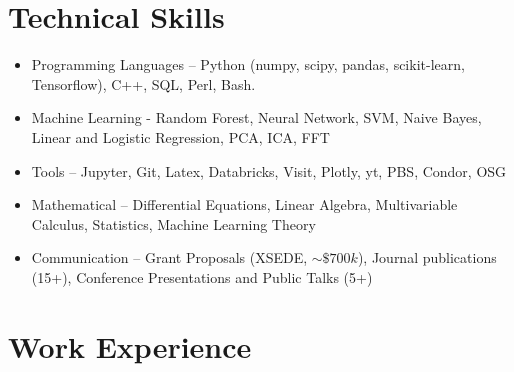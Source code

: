 \documentclass[11pt,a4paper,sans]{moderncv}       %
\begin{document}
\section{Technical Skills}
\vspace{1pt}
\small{
\begin{itemize}
\item{ Programming Languages – Python (numpy, scipy, pandas, scikit-learn, Tensorflow), C++, SQL, Perl, Bash.} %
\vspace{4pt}
\item{Machine Learning - Random Forest, Neural Network, SVM, Naive Bayes, Linear and Logistic Regression,  PCA, ICA, FFT}
\vspace{4pt}
\item{Tools – Jupyter, Git, Latex, Databricks, Visit, Plotly, yt, PBS, Condor, OSG}
\vspace{4pt}
\item{Mathematical – Differential Equations, Linear Algebra, Multivariable Calculus, Statistics, Machine Learning Theory}\vspace{4pt}
\item{Communication – Grant Proposals (XSEDE, $\sim \$700k$), Journal publications (15+), Conference Presentations and Public Talks (5+)}
\end{itemize}
}
\section{Work Experience}

\vspace{1pt}
\end{document}
